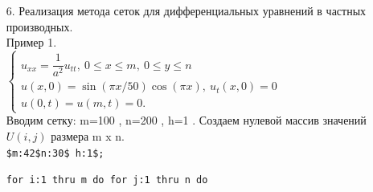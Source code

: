 \documentclass[article, bachelor, och, pract]{SCWorks}
\begin{document}
\begin{itemize}
\item[6.] Реализация метода сеток для дифференциальных уравнений в частных производных.\\
Пример 1. \\
\( \left\{
\begin{array}{l}
u_{xx}=\dfrac{1}{a^{2}}u_{tt}, \ 0\leq x\leq m, \ 0\leq y\leq n \\
u(x,0)=\sin(\pi x/50)\cos(\pi x), \ u_{t}(x,0)=0 \\
u(0,t)=u(m,t)=0.
\end{array} \right. \) \\
Вводим сетку: m=100 , n=200 , h=1 . Создаем нулевой массив значений \(U(i,j)\) размера m x n.\\
\texttt{\$m:42\$n:30\$ h:1\$;}

\texttt{for i:1 thru m do for j:1 thru n do}


\end{itemize}
\end{document}
